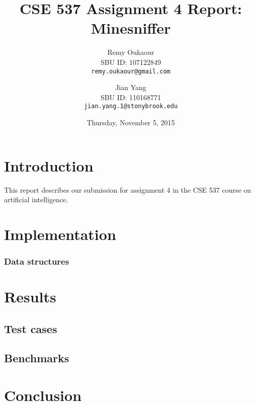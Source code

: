 \documentclass[11pt]{article}
\title{CSE 537 Assignment 4 Report: Minesniffer}
\author{
Remy Oukaour \\
	{\small SBU ID: 107122849}\\
	{\small \texttt{remy.oukaour@gmail.com}}
\and
Jian Yang \\
	{\small SBU ID: 110168771}\\
	{\small \texttt{jian.yang.1@stonybrook.edu}}
}
\date{Thursday, November 5, 2015}
\begin{document}
\maketitle

\section{Introduction}

This report describes our submission for assignment 4 in the CSE 537 course on
artificial intelligence.

\section{Implementation}

\subsubsection{Data structures}

\section{Results}

\subsection{Test cases}

\subsection{Benchmarks}

\section{Conclusion}
\end{document}
